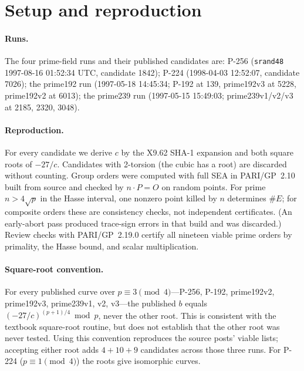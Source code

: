 \documentclass[11pt]{article}
\begin{document}
\section{Setup and reproduction}\label{sec:setup}

\paragraph{Runs.} The four prime-field runs and their published candidates are: P-256 (\texttt{srand48} 1997-08-16 01:52:34 UTC, candidate 1842); P-224 (1998-04-03 12:52:07, candidate 7026); the prime192 run (1997-05-18 14:45:34; P-192 at 139, prime192v3 at 5228, prime192v2 at 6013); the prime239 run (1997-05-15 15:49:03; prime239v1/v2/v3 at 2185, 2320, 3048).

\paragraph{Reproduction.} For every candidate we derive $c$ by the X9.62 SHA-1 expansion and both square roots of $-27/c$. Candidates with 2-torsion (the cubic has a root) are discarded without counting. Group orders were computed with full SEA in PARI/GP~2.10 built from source and checked by $n\cdot P = O$ on random points. For prime $n>4\sqrt p$ in the Hasse interval, one nonzero point killed by $n$ determines $\#E$; for composite orders these are consistency checks, not independent certificates. (An early-abort pass produced trace-sign errors in that build and was discarded.) Review checks with PARI/GP~2.19.0 certify all nineteen viable prime orders by primality, the Hasse bound, and scalar multiplication.

\paragraph{Square-root convention.} For every published curve over $p\equiv 3\pmod 4$---P-256, P-192, prime192v2, prime192v3, prime239v1, v2, v3---the published $b$ equals $(-27/c)^{(p+1)/4} \bmod p$, never the other root. This is consistent with the textbook square-root routine, but does not establish that the other root was never tested. Using this convention reproduces the source posts' viable lists; accepting either root adds $4+10+9$ candidates across those three runs. For P-224 ($p\equiv1\pmod4$) the roots give isomorphic curves.
\end{document}
